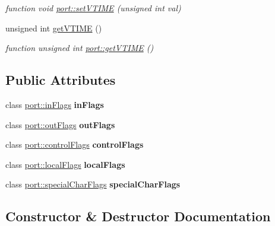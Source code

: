 \begin{DoxyCompactItemize}
\begin{DoxyCompactList}\small\item\em function void \hyperlink{classport_a43d05a6b037dccbf2666b87d4b49313a}{port\+::set\+V\+T\+I\+ME} (unsigned int val) \end{DoxyCompactList}\item 
unsigned int \hyperlink{classport_a0d929e2f0e5333b56cffb534c5f6fbdc}{get\+V\+T\+I\+ME} ()
\begin{DoxyCompactList}\small\item\em function unsigned int \hyperlink{classport_a0d929e2f0e5333b56cffb534c5f6fbdc}{port\+::get\+V\+T\+I\+ME} () \end{DoxyCompactList}\end{DoxyCompactItemize}
\subsection*{Public Attributes}
\begin{DoxyCompactItemize}
\item 
class \hyperlink{classport_1_1inFlags}{port\+::in\+Flags} {\bfseries in\+Flags}\hypertarget{classport_af0a59d590b28a89ce407b35a5b35e732}{}\label{classport_af0a59d590b28a89ce407b35a5b35e732}

\item 
class \hyperlink{classport_1_1outFlags}{port\+::out\+Flags} {\bfseries out\+Flags}\hypertarget{classport_a68b4c1db043259c0c329513990e8a9fc}{}\label{classport_a68b4c1db043259c0c329513990e8a9fc}

\item 
class \hyperlink{classport_1_1controlFlags}{port\+::control\+Flags} {\bfseries control\+Flags}\hypertarget{classport_a0a1349f99d686112de07ba7d3ddc3c0c}{}\label{classport_a0a1349f99d686112de07ba7d3ddc3c0c}

\item 
class \hyperlink{classport_1_1localFlags}{port\+::local\+Flags} {\bfseries local\+Flags}\hypertarget{classport_aac03e5dd83c70315031ad1b03fe9b3b7}{}\label{classport_aac03e5dd83c70315031ad1b03fe9b3b7}

\item 
class \hyperlink{classport_1_1specialCharFlags}{port\+::special\+Char\+Flags} {\bfseries special\+Char\+Flags}\hypertarget{classport_aca6175ff7b011bf6f56326c5b05fe20e}{}\label{classport_aca6175ff7b011bf6f56326c5b05fe20e}

\end{DoxyCompactItemize}


\subsection{Constructor \& Destructor Documentation}
